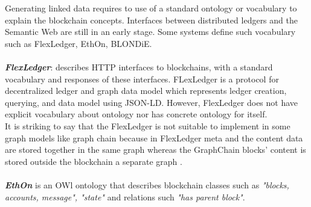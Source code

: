 Generating linked data requires to use of a standard ontology or vocabulary to explain the blockchain concepts. Interfaces between distributed ledgers and the Semantic Web are still in an early stage. Some systems define such vocabulary such as FlexLedger, EthOn, BLONDiE\cite{Third}.\\
\\
\textbf{\textit{FlexLedger}}: describes HTTP interfaces to blockchains, with a standard vocabulary and responses of these interfaces. FLexLedger is a protocol for decentralized ledger and graph data model which represents ledger creation, querying, and data model using JSON-LD. However, FlexLedger does not have explicit vocabulary about ontology nor has concrete ontology for itself. \\
It is striking to say that the FlexLedger is not suitable to implement in some graph models like graph chain because in FlexLedger meta and the content data are stored together in the same graph whereas the GraphChain blocks’ content is stored outside the blockchain a separate graph \cite{Sopek}.\\
\\
\textbf{\textit{EthOn}} is an OWl ontology that describes blockchain classes such as \textit{"blocks, accounts, message", "state"} and relations such \textit{"has parent block"}\cite{Rashid}. 
